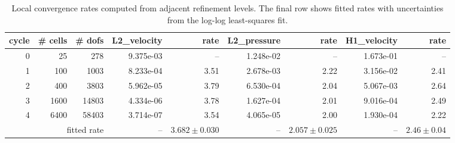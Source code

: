 \begin{table}[htbp]
\centering
\begin{tabular}{|r|r|r|r|r|r|r|r|r|}
\hline
cycle & \# cells & \# dofs & L2\_velocity & rate & L2\_pressure & rate & H1\_velocity & rate \\ \hline
0 & 25 & 278 & 9.375e-03 & -- & 1.248e-02 & -- & 1.673e-01 & -- \\ \hline
1 & 100 & 1003 & 8.233e-04 & 3.51 & 2.678e-03 & 2.22 & 3.156e-02 & 2.41 \\ \hline
2 & 400 & 3803 & 5.962e-05 & 3.79 & 6.530e-04 & 2.04 & 5.067e-03 & 2.64 \\ \hline
3 & 1600 & 14803 & 4.334e-06 & 3.78 & 1.627e-04 & 2.01 & 9.016e-04 & 2.49 \\ \hline
4 & 6400 & 58403 & 3.714e-07 & 3.54 & 4.065e-05 & 2.00 & 1.930e-04 & 2.22 \\ \hline
\multicolumn{3}{|r|}{fitted rate} & -- & $3.682 \pm 0.030$ & -- & $2.057 \pm 0.025$ & -- & $2.46 \pm 0.04$ \\ \hline
\end{tabular}
\caption{Local convergence rates computed from adjacent refinement levels. The final row shows fitted rates with uncertainties from the log-log least-squares fit.}
\end{table}
